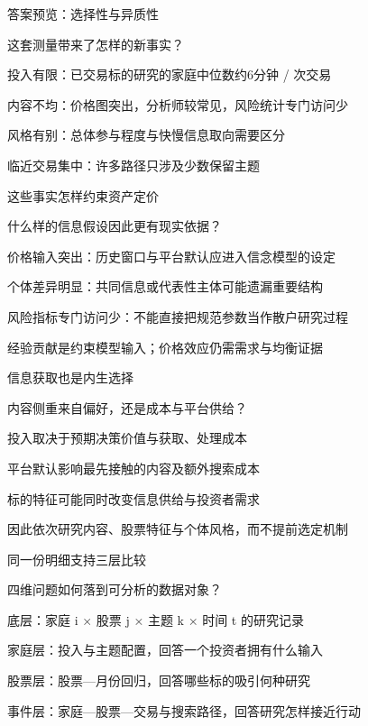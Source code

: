 \documentclass[11pt,compress]{beamer}
\begin{document}
\begin{frame}{答案预览：选择性与异质性}\relax
{\small\color{tsinghua}这套测量带来了怎样的新事实？\par}\medskip
投入有限：已交易标的研究的家庭中位数约6分钟 / 次交易\par\medskip
内容不均：价格图突出，分析师较常见，风险统计专门访问少\par\medskip
风格有别：总体参与程度与快慢信息取向需要区分\par\medskip
临近交易集中：许多路径只涉及少数保留主题\par\medskip
{}
\end{frame}
\begin{frame}{这些事实怎样约束资产定价}\relax
{\small\color{tsinghua}什么样的信息假设因此更有现实依据？\par}\medskip
价格输入突出：历史窗口与平台默认应进入信念模型的设定\par\medskip
个体差异明显：共同信息或代表性主体可能遗漏重要结构\par\medskip
风险指标专门访问少：不能直接把规范参数当作散户研究过程\par\medskip
经验贡献是约束模型输入；价格效应仍需需求与均衡证据\par\medskip
{}
\end{frame}
\begin{frame}{信息获取也是内生选择}\relax
{\small\color{tsinghua}内容侧重来自偏好，还是成本与平台供给？\par}\medskip
投入取决于预期决策价值与获取、处理成本\par\medskip
平台默认影响最先接触的内容及额外搜索成本\par\medskip
标的特征可能同时改变信息供给与投资者需求\par\medskip
因此依次研究内容、股票特征与个体风格，而不提前选定机制\par\medskip
{}
\end{frame}
\begin{frame}{同一份明细支持三层比较}\relax
{\small\color{tsinghua}四维问题如何落到可分析的数据对象？\par}\medskip
底层：家庭 i × 股票 j × 主题 k × 时间 t 的研究记录\par\medskip
家庭层：投入与主题配置，回答一个投资者拥有什么输入\par\medskip
股票层：股票—月份回归，回答哪些标的吸引何种研究\par\medskip
事件层：家庭—股票—交易与搜索路径，回答研究怎样接近行动\par\medskip
{}
\end{frame}
\end{document}
